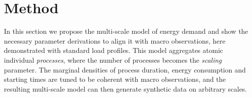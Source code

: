 \documentclass[conference]{IEEEtran}
\begin{document}





\section{Method}
\label{sec:Method}

In this section we propose the multi-scale model of energy demand and show the necessary parameter derivations to align it with macro observations, here demonstrated with standard load profiles. This model aggregates atomic individual \emph{processes}, where the number of processes becomes the \emph{scaling} parameter. The marginal densities of process duration, energy consumption and starting times are tuned to be coherent with macro observations, and the resulting multi-scale model can then generate synthetic data on arbitrary scales.
\end{document}
